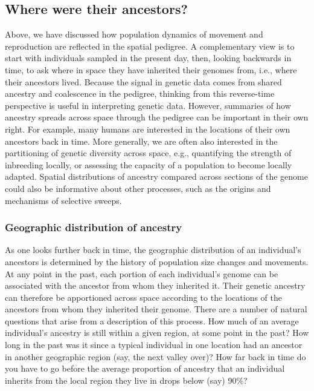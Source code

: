 \documentclass{ar-1col}
\begin{document}
{%
\subsection{Where were their ancestors?}

Above, we have discussed how population dynamics of movement and reproduction
are reflected in the spatial pedigree.
A complementary view is to
start with individuals sampled in the present day,
then, looking backwards in time,
to ask where in space they have inherited their genomes from, 
i.e., where their ancestors lived.
Because the signal in genetic data comes from 
shared ancestry and coalescence in the pedigree,
thinking from this reverse-time perspective 
is useful in interpreting genetic data.
However, summaries of how ancestry spreads across space 
through the pedigree can be important in their own right.
For example, many humans are interested
in the locations of their own ancestors back in time.
More generally,
we are often also interested in the partitioning of genetic diversity across space,
e.g.,
quantifying the strength of inbreeding locally,
or assessing the capacity of a population to become locally adapted.
Spatial distributions of ancestry compared across sections of the genome
could also be informative about other processes, such as
the origins and mechanisms of selective sweeps.


\subsubsection{Geographic distribution of ancestry}

As one looks further back in time,
the geographic distribution of an individual's ancestors
is determined by the history of population size changes and movements.
At any point in the past,
each portion of each individual's genome can be associated 
with the ancestor from whom they inherited it.
Their genetic ancestry can therefore be apportioned across space according
to the locations of the ancestors from whom they inherited their genome.
There are a number of natural questions that arise from a description of this process.
How much of an average individual's ancestry is still within a given region, 
at some point in the past?
How long in the past was it since a typical individual in one location had an ancestor
in another geographic region (say, the next valley over)?
How far back in time do you have to go before 
the average proportion of ancestry that an individual inherits
from the local region they live in drops below (say) 90\%?

}
\end{document}
